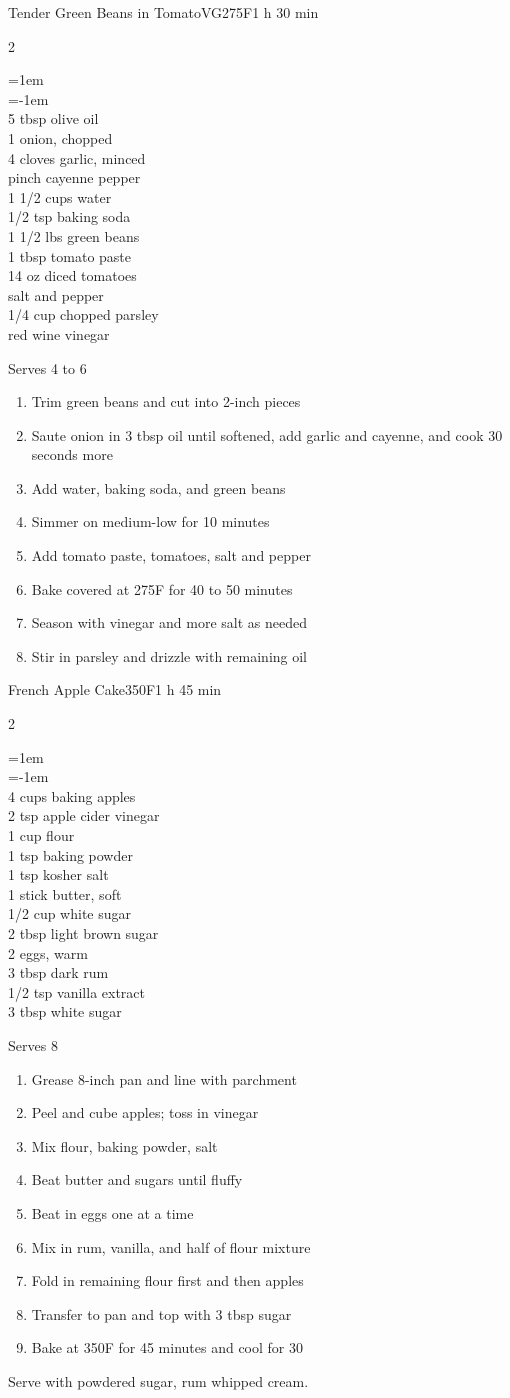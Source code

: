 \documentclass{article}
\newenvironment{recipe}[3][]
    {\begin{cardbase}[#1]{#2}{#3}
    \columnratio{0.333}
    \begin{paracol}{2}}
    {\end{paracol}\end{cardbase}}
\newenvironment{denserecipe}[3][]
    {\small
    \begin{recipe}[#1]{#2}{#3}}
    {\end{recipe}}
\newcommand{\nextcolumn}{\switchcolumn}
\newenvironment{ingredients}
    {
    \begin{obeylines}
    \vspace{\parskip}
    \setlength{\parskip}{0.25em}
    \vspace{-0.25em}
    \leftskip=1em
    \parindent=-1em}
    {\end{obeylines}}
\newenvironment{steps}
    {\begin{enumerate}[leftmargin=*,topsep=0pt]}
    {\end{enumerate}}
\newcommand{\fahrenheit}[1]{#1\textdegree{}F}
\newcommand{\tag}[1]{\hspace{1em}#1}
\newcommand{\symboltag}[2]{\tag{#1\hspace{0.4em}#2}}
\newcommand{\totaltime}[1]{\symboltag{\raisebox{-0.1em}{\small\StopWatchEnd}}{#1}}
\newcommand{\preheat}[1]{\symboltag{\Topbottomheat}{#1}}
\begin{document}
\begin{denserecipe}{Tender Green Beans in Tomato}{\tag{VG}\preheat{\fahrenheit{275}}\totaltime{1 h 30 min}}
\begin{ingredients}
5 tbsp olive oil
1 onion, chopped
4 cloves garlic, minced
pinch cayenne pepper
1 1/2 cups water
1/2 tsp baking soda
1 1/2 lbs green beans
1 tbsp tomato paste
14 oz diced tomatoes
salt and pepper
1/4 cup chopped parsley
red wine vinegar
\end{ingredients}
\nextcolumn
Serves 4 to 6
\begin{steps}
    \item Trim green beans and cut into 2-inch pieces
    \item Saute onion in 3 tbsp oil until softened, add garlic and cayenne, and cook 30 seconds more
    \item Add water, baking soda, and green beans
    \item Simmer on medium-low for 10 minutes
    \item Add tomato paste, tomatoes, salt and pepper
    \item Bake covered at \fahrenheit{275} for 40 to 50 minutes
    \item Season with vinegar and more salt as needed
    \item Stir in parsley and drizzle with remaining oil
\end{steps}
\end{denserecipe}

\begin{denserecipe}{French Apple Cake}{\preheat{\fahrenheit{350}}\totaltime{1 h 45 min}}
\begin{ingredients}
4 cups baking apples
2 tsp apple cider vinegar
1 cup flour
1 tsp baking powder
1 tsp kosher salt
1 stick butter, soft
1/2 cup white sugar
2 tbsp light brown sugar
2 eggs, warm
3 tbsp dark rum
1/2 tsp vanilla extract
3 tbsp white sugar
\end{ingredients}
\nextcolumn
Serves 8
\begin{steps}
    \item Grease 8-inch pan and line with parchment
    \item Peel and cube apples; toss in vinegar
    \item Mix flour, baking powder, salt
    \item Beat butter and sugars until fluffy
    \item Beat in eggs one at a time
    \item Mix in rum, vanilla, and half of flour mixture
    \item Fold in remaining flour first and then apples
    \item Transfer to pan and top with 3 tbsp sugar
    \item Bake at \fahrenheit{350} for 45 minutes and cool for 30
\end{steps}
Serve with powdered sugar, rum whipped cream.
\end{denserecipe}
\end{document}
